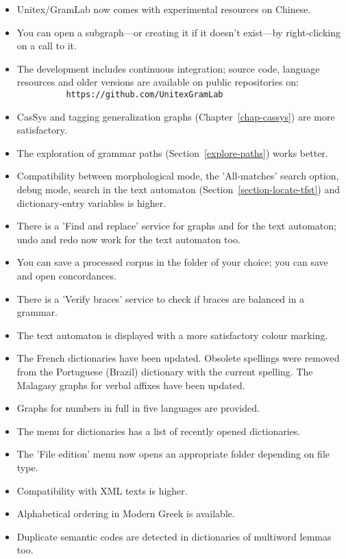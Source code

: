 \begin{itemize}
  \item Unitex/GramLab now comes with experimental resources on Chinese.
  \item You can open a subgraph---or creating it if it doesn't exist---by
  right-clicking on a call to it.
  \item The development includes continuous integration; source code, language
  resources and older versions are available on public repositories on:\\
  \verb$          https://github.com/UnitexGramLab$
  \item CasSys and tagging generalization graphs (Chapter~\ref{chap-cassys}) are more satisfactory.
  \item The exploration of grammar paths (Section~\ref{explore-paths}) works better.
  \item Compatibility between morphological mode, the 'All-matches' search option,
  debug mode, search in the text automaton (Section~\ref{section-locate-tfst}) and
  dictionary-entry variables is higher.
  \item There is a 'Find and replace' service for graphs and for the text automaton;
  undo and redo now work for the text automaton too.
  \item You can save a processed corpus in the folder of your choice; you can save
  and open concordances.
  \item There is a 'Verify braces' service to check if braces are balanced in a grammar.
  \item The text automaton is displayed with a more satisfactory colour marking.
  \item The French dictionaries have been updated. Obsolete spellings were removed
  from the Portuguese (Brazil) dictionary with the current spelling. The Malagasy
  graphs for verbal affixes have been updated.
  \item Graphs for numbers in full in five languages are provided.
  \item The menu for dictionaries has a list of recently opened dictionaries.
  \item The 'File edition' menu now opens an appropriate folder depending on file type.
  \item Compatibility with XML texts is higher.
  \item Alphabetical ordering in Modern Greek is available.
  \item Duplicate semantic codes are detected in dictionaries of multiword
  lemmas too.

\end{itemize}
